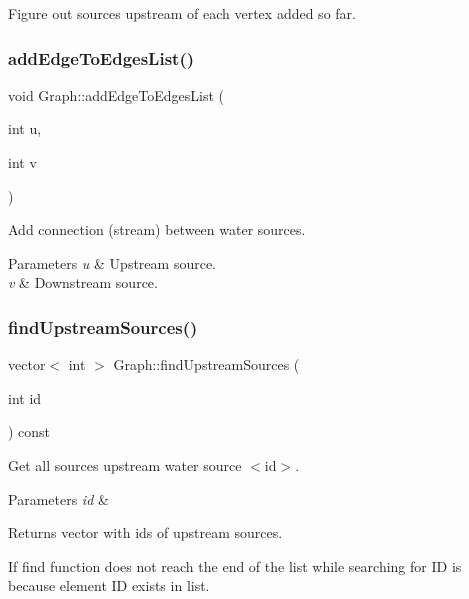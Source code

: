 Figure out sources upstream of each vertex added so far. \mbox{\label{classGraph_a6f175234dc3c87150a53eab5c4e586ef}} 
\subsubsection{\texorpdfstring{add\+Edge\+To\+Edges\+List()}{addEdgeToEdgesList()}}
{\footnotesize\ttfamily void Graph\+::add\+Edge\+To\+Edges\+List (\begin{DoxyParamCaption}\item[{int}]{u,  }\item[{int}]{v }\end{DoxyParamCaption})\hspace{0.3cm}{\ttfamily [protected]}}

Add connection (stream) between water sources. 
\begin{DoxyParams}{Parameters}
{\em u} & Upstream source. \\
\hline
{\em v} & Downstream source. \\
\hline
\end{DoxyParams}
\mbox{\label{classGraph_a17fc2fd799b56ac496aa57036f3696d7}} 
\subsubsection{\texorpdfstring{find\+Upstream\+Sources()}{findUpstreamSources()}}
{\footnotesize\ttfamily vector$<$ int $>$ Graph\+::find\+Upstream\+Sources (\begin{DoxyParamCaption}\item[{int}]{id }\end{DoxyParamCaption}) const\hspace{0.3cm}{\ttfamily [protected]}}

Get all sources upstream water source $<$id$>$. 
\begin{DoxyParams}{Parameters}
{\em id} & \\
\hline
\end{DoxyParams}
\begin{DoxyReturn}{Returns}
vector with id\textquotesingle{}s of upstream sources. 
\end{DoxyReturn}
If find function does not reach the end of the list while searching for ID is because element ID exists in list. \mbox{\label{classGraph_aa6e27da7010986d54cd2ec79dbbf4abe}} 
